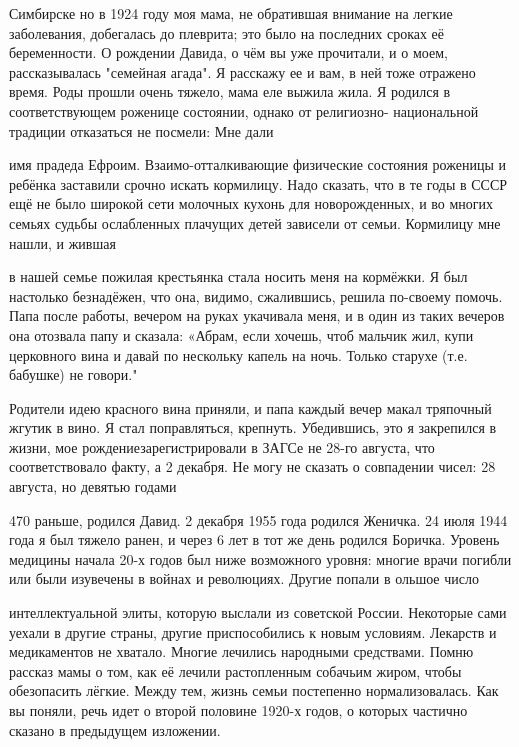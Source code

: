 \label{141-1}
Симбирске но в 1924 году моя мама, не обратившая внимание на легкие заболевания, добегалась до плеврита; это было на последних сроках её беременности. О рождении Давида, о чём вы уже прочитали, и о моем,  рассказывалась  "семейная агада". Я расскажу ее и вам, в ней тоже отражено время. Роды прошли очень тяжело, мама еле выжила жила. Я родился в соответствующем роженице состоянии, однако от религиозно- национальной традиции отказаться не посмели: Мне дали

\label{142-1}
имя прадеда Ефроим. Взаимо-отталкивающие физические состояния роженицы и ребёнка заставили срочно искать кормилицу. Надо сказать, что в те годы в СССР ещё не было широкой сети молочных кухонь для новорожденных, и во многих семьях судьбы ослабленных плачущих детей зависели от семьи. Кормилицу мне нашли, и жившая 

\label{143-1}
в нашей семье пожилая крестьянка стала носить меня на кормёжки. Я был настолько безнадёжен, что она, видимо, сжалившись, решила по-своему помочь. Папа после работы, вечером на руках укачивала меня, и в один из таких вечеров она отозвала папу и сказала: «Абрам, если хочешь, чтоб мальчик жил, купи церковного вина и давай по нескольку капель на ночь. Только старухе (т.е. бабушке) не говори."

\label{144-1}
Родители идею красного вина приняли, и папа каждый вечер макал тряпочный жгутик в вино. Я стал поправляться, крепнуть. Убедившись, это я закрепился в жизни, мое рождениезарегистрировали в ЗАГСе не 28-го августа, что соответствовало факту, а 2 декабря. Не могу не сказать о совпадении чисел: 28 августа, но девятью годами

\label{145-1}
470
раньше, родился Давид. 2 декабря 1955 года родился Женичка. 24 июля 1944 года я был тяжело ранен, и через 6 лет в тот же день родился Боричка.
Уровень медицины начала 20-х годов был ниже возможного уровня: многие врачи погибли или были изувечены в войнах и революциях. Другие попали в ольшое число 

\label{146-1}
интеллектуальной элиты, которую выслали из советской России. Некоторые сами уехали в другие страны, другие приспособились к новым условиям. Лекарств и медикаментов не хватало. Многие лечились народными средствами. Помню рассказ мамы о том, как её лечили растопленным собачьим жиром, чтобы обезопасить лёгкие. Между тем, жизнь семьи постепенно нормализовалась. Как вы поняли, речь идет о второй половине 1920-х годов, о которых частично сказано в предыдущем изложении.